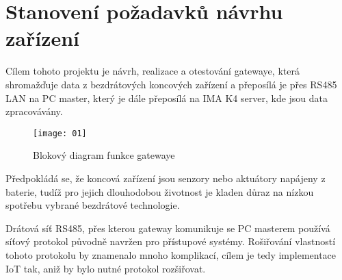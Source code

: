 \chapter{Stanovení požadavků návrhu zařízení}

Cílem tohoto projektu je návrh, realizace a otestování gatewaye, která shromažďuje data z bezdrátových koncových zařízení a přeposílá je přes RS485 LAN na PC master, který je dále přeposílá na IMA K4 server, kde jsou data zpracovávány.

\begin{figure}[!h]
    \centering
    \texttt{[image: 01]}
    \caption{Blokový diagram funkce gatewaye}
    \label{fig:block diagram of the system}
\end{figure}

Předpokládá se, že koncová zařízení jsou senzory nebo aktuátory napájeny z baterie, tudíž pro jejich dlouhodobou životnost je kladen důraz na nízkou spotřebu vybrané bezdrátové technologie.

Drátová síť RS485, přes kterou gateway komunikuje se PC masterem používá síťový protokol původně navržen pro přístupové systémy. 
Rošiřování vlastností tohoto protokolu by znamenalo mnoho komplikací, cílem je tedy implementace IoT tak, aniž by bylo nutné protokol rozšiřovat.
